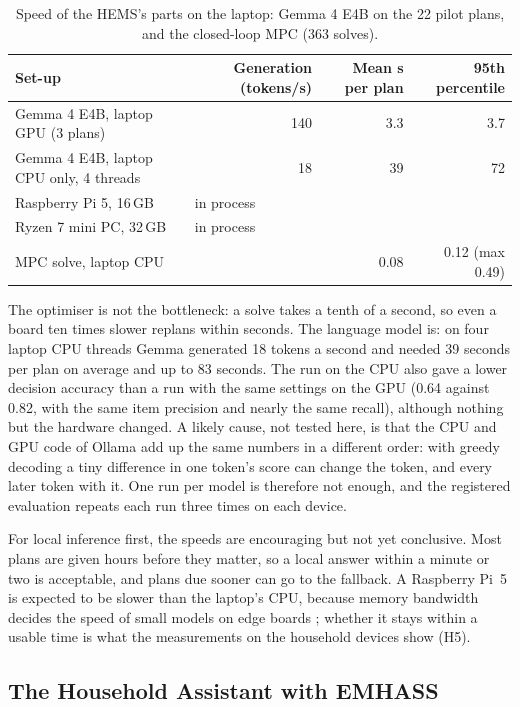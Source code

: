 \begin{table}[htbp]
\caption{Speed of the HEMS's parts on the laptop: Gemma 4 E4B on the
22 pilot plans, and the closed-loop MPC (363 solves).}
\label{tab:edgebench}
\small
\begin{tabularx}{\textwidth}{@{}Xrrr@{}}
\toprule
Set-up & Generation (tokens/s) & Mean s per plan & 95th percentile \\
\midrule
Gemma 4 E4B, laptop GPU (3 plans) & 140 & 3.3 & 3.7 \\
Gemma 4 E4B, laptop CPU only, 4 threads & 18 & 39 & 72 \\
Raspberry Pi 5, 16\,GB & \multicolumn{3}{l}{in process} \\
Ryzen 7 mini PC, 32\,GB & \multicolumn{3}{l}{in process} \\
\midrule
MPC solve, laptop CPU & & 0.08 & 0.12 (max 0.49) \\
\bottomrule
\end{tabularx}
\end{table}

The optimiser is not the bottleneck: a solve takes a tenth of a second,
so even a board ten times slower replans within seconds. The language
model is: on four laptop CPU threads Gemma generated 18 tokens a second
and needed 39 seconds per plan on average and up to 83 seconds. The run
on the CPU also gave a lower decision accuracy than a run with the same
settings on the GPU (0.64 against 0.82, with the same item precision and
nearly the same recall), although nothing but the hardware changed. A
likely cause, not tested here, is that the CPU and GPU code of Ollama
add up the same numbers in a different order: with greedy decoding a
tiny difference in one token's score can change the token, and every
later token with it. One run per model is therefore not enough, and the
registered evaluation repeats each run three times on each device.

For local inference first, the speeds are encouraging but not yet
conclusive. Most plans are given hours before they matter, so a local
answer within a minute or two is acceptable, and plans due sooner can
go to the fallback. A Raspberry Pi~5 is expected to be slower than the
laptop's CPU, because memory bandwidth decides the speed of small
models on edge boards \parencite{islam2025}; whether it stays within a
usable time is what the measurements on the household devices show
(H5).

\subsection{The Household Assistant with EMHASS}
\label{sec:emhassdemo}

